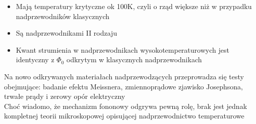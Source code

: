 \documentclass[a4paper,11pt]{article}
\begin{document}
\begin{description}
\begin{itemize}
    \item Mają temperatury krytyczne ok 100K, czyli o rząd większe niż w przypadku nadprzewodników klasycznych
    \item Są nadprzewodnikami II rodzaju
    \item Kwant strumienia w nadprzewodnikach wysokotemperaturowych jest identyczny z $\Phi_0$ odkrytym w klasycznych nadprzewodnikach
  \end{itemize}
  Na nowo odkrywanych materiałach nadprzewodzących przeprowadza się testy obejmujące: badanie efektu Meissnera, zmiennoprądowe zjawisko Josephsona, trwałe prądy i zerowy opór elektryczny\\
  Choć wiadomo, że mechanizm fononowy odgrywa pewną rolę, brak jest jednak kompletnej teorii mikroskopowej opisującej nadprzewodnictwo temperaturowe
\end{description}
\end{document}
